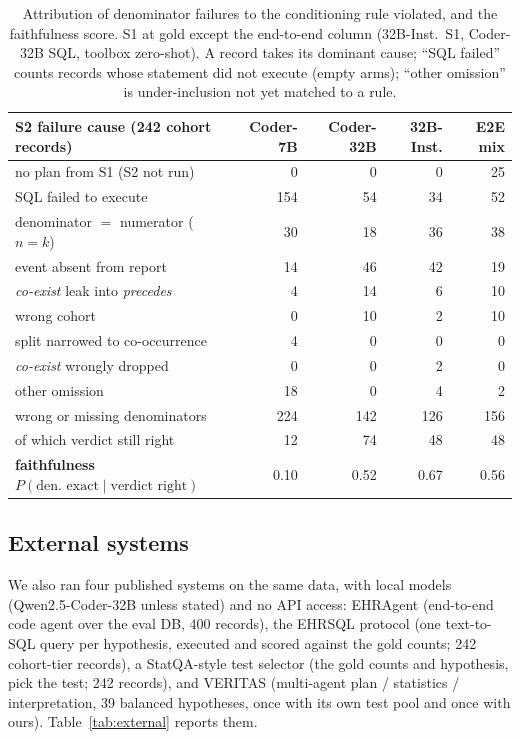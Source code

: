 \begin{table}[t]
\centering
\footnotesize
\setlength{\tabcolsep}{4pt}
\begin{tabular}{lrrrr}
\toprule
S2 failure cause (242 cohort records) & Coder-7B & Coder-32B & 32B-Inst. & E2E mix \\
\midrule
no plan from S1 (S2 not run) & 0 & 0 & 0 & 25 \\
SQL failed to execute & 154 & 54 & 34 & 52 \\
denominator $=$ numerator ($n=k$) & 30 & 18 & 36 & 38 \\
event absent from report & 14 & 46 & 42 & 19 \\
\emph{co-exist} leak into \emph{precedes} & 4 & 14 & 6 & 10 \\
wrong cohort & 0 & 10 & 2 & 10 \\
split narrowed to co-occurrence & 4 & 0 & 0 & 0 \\
\emph{co-exist} wrongly dropped & 0 & 0 & 2 & 0 \\
other omission & 18 & 0 & 4 & 2 \\
\midrule
wrong or missing denominators & 224 & 142 & 126 & 156 \\
\quad of which verdict still right & 12 & 74 & 48 & 48 \\
\textbf{faithfulness} $P(\text{den.\ exact} \mid \text{verdict right})$ & 0.10 & 0.52 & 0.67 & 0.56 \\
\bottomrule
\end{tabular}
\caption{Attribution of denominator failures to the conditioning rule violated,
and the faithfulness score. S1 at gold except the end-to-end column (32B-Inst.\
S1, Coder-32B SQL, toolbox zero-shot). A record takes its dominant cause;
``SQL failed'' counts records whose statement did not execute (empty arms); ``other omission'' is under-inclusion not yet matched to a rule.}
\label{tab:attribution}
\end{table}

\subsection{External systems}

We also ran four published systems on the same data, with local models
(Qwen2.5-Coder-32B unless stated) and no API access: EHRAgent
(end-to-end code agent over the eval DB, 400 records), the EHRSQL
protocol (one text-to-SQL query per hypothesis, executed and
scored against the gold counts; 242 cohort-tier records), a StatQA-style test
selector (the gold counts and hypothesis, pick the test; 242
records), and VERITAS (multi-agent plan / statistics /
interpretation, 39 balanced hypotheses, once with its own test pool and once
with ours). Table~\ref{tab:external} reports them.

